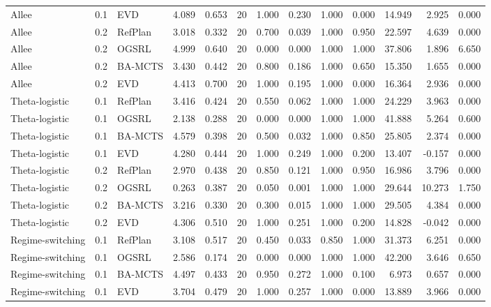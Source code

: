 \documentclass[10pt]{article}
\begin{document}
\begin{landscape}
\begin{center}
\begin{longtable}{@{}lllr@{}r@{}r@{}rrrrrrr@{}}
Allee & 0.1 & EVD & 4.089 & 0.653 & 20 & 1.000 & 0.230 & 1.000 & 0.000 & 14.949 & 2.925 & 0.000 \\
\addlinespace[1.5pt]
Allee & 0.2 & RefPlan & 3.018 & 0.332 & 20 & 0.700 & 0.039 & 1.000 & 0.950 & 22.597 & 4.639 & 0.000 \\
Allee & 0.2 & OGSRL & 4.999 & 0.640 & 20 & 0.000 & 0.000 & 1.000 & 1.000 & 37.806 & 1.896 & 6.650 \\
Allee & 0.2 & BA-MCTS & 3.430 & 0.442 & 20 & 0.800 & 0.186 & 1.000 & 0.650 & 15.350 & 1.655 & 0.000 \\
Allee & 0.2 & EVD & 4.413 & 0.700 & 20 & 1.000 & 0.195 & 1.000 & 0.000 & 16.364 & 2.936 & 0.000 \\
\addlinespace[1.5pt]
Theta-logistic & 0.1 & RefPlan & 3.416 & 0.424 & 20 & 0.550 & 0.062 & 1.000 & 1.000 & 24.229 & 3.963 & 0.000 \\
Theta-logistic & 0.1 & OGSRL & 2.138 & 0.288 & 20 & 0.000 & 0.000 & 1.000 & 1.000 & 41.888 & 5.264 & 0.600 \\
Theta-logistic & 0.1 & BA-MCTS & 4.579 & 0.398 & 20 & 0.500 & 0.032 & 1.000 & 0.850 & 25.805 & 2.374 & 0.000 \\
Theta-logistic & 0.1 & EVD & 4.280 & 0.444 & 20 & 1.000 & 0.249 & 1.000 & 0.200 & 13.407 & -0.157 & 0.000 \\
\addlinespace[1.5pt]
Theta-logistic & 0.2 & RefPlan & 2.970 & 0.438 & 20 & 0.850 & 0.121 & 1.000 & 0.950 & 16.986 & 3.796 & 0.000 \\
Theta-logistic & 0.2 & OGSRL & 0.263 & 0.387 & 20 & 0.050 & 0.001 & 1.000 & 1.000 & 29.644 & 10.273 & 1.750 \\
Theta-logistic & 0.2 & BA-MCTS & 3.216 & 0.330 & 20 & 0.300 & 0.015 & 1.000 & 1.000 & 29.505 & 4.384 & 0.000 \\
Theta-logistic & 0.2 & EVD & 4.306 & 0.510 & 20 & 1.000 & 0.251 & 1.000 & 0.200 & 14.828 & -0.042 & 0.000 \\
\addlinespace[1.5pt]
Regime-switching & 0.1 & RefPlan & 3.108 & 0.517 & 20 & 0.450 & 0.033 & 0.850 & 1.000 & 31.373 & 6.251 & 0.000 \\
Regime-switching & 0.1 & OGSRL & 2.586 & 0.174 & 20 & 0.000 & 0.000 & 1.000 & 1.000 & 42.200 & 3.646 & 0.650 \\
Regime-switching & 0.1 & BA-MCTS & 4.497 & 0.433 & 20 & 0.950 & 0.272 & 1.000 & 0.100 & 6.973 & 0.657 & 0.000 \\
Regime-switching & 0.1 & EVD & 3.704 & 0.479 & 20 & 1.000 & 0.257 & 1.000 & 0.000 & 13.889 & 3.966 & 0.000 \\

\end{longtable}
\end{center}
\end{landscape}
\end{document}

